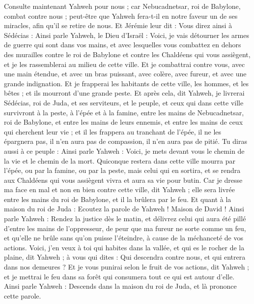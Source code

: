 \begin{multicols}{2}
Consulte maintenant Yahweh pour nous ; car Nebucadnetsar, roi de Babylone, combat contre nous ; peut-être que Yahweh fera-t-il en notre faveur un de ses miracles, afin qu'il se retire de nous.
Et Jérémie leur dit : Vous direz ainsi à Sédécias :
Ainsi parle Yahweh, le Dieu d'Israël : Voici, je vais détourner les armes de guerre qui sont dans vos mains, et avec lesquelles vous combattez en dehors des murailles contre le roi de Babylone et contre les Chaldéens qui vous assiègent, et je les rassemblerai au milieu de cette ville.
Et je combattrai contre vous, avec une main étendue, et avec un bras puissant, avec colère, avec fureur, et avec une grande indignation.
Et je frapperai les habitants de cette ville, les hommes, et les bêtes ; et ils mourront d'une grande peste.
Et après cela, dit Yahweh, je livrerai Sédécias, roi de Juda, et ses serviteurs, et le peuple, et ceux qui dans cette ville survivront à la peste, à l'épée et à la famine, entre les mains de Nebucadnetsar, roi de Babylone, et entre les mains de leurs ennemis, et entre les mains de ceux qui cherchent leur vie ; et il les frappera au tranchant de l'épée, il ne les épargnera pas, il n'en aura pas de compassion, il n'en aura pas de pitié.
Tu diras aussi à ce peuple : Ainsi parle Yahweh : Voici, je mets devant vous le chemin de la vie et le chemin de la mort.
Quiconque restera dans cette ville mourra par l'épée, ou par la famine, ou par la peste, mais celui qui en sortira, et se rendra aux Chaldéens qui vous assiègent vivra et aura sa vie pour butin.
Car je dresse ma face en mal et non en bien contre cette ville, dit Yahweh ; elle sera livrée entre les mains du roi de Babylone, et il la brûlera par le feu.
Et quant à la maison du roi de Juda : Ecoutez la parole de Yahweh !
Maison de David ! Ainsi parle Yahweh : Rendez la justice dès le matin, et délivrez celui qui aura été pillé d'entre les mains de l'oppresseur, de peur que ma fureur ne sorte comme un feu, et qu'elle ne brûle sans qu'on puisse l'éteindre, à cause de la méchanceté de vos actions.
Voici, j'en veux à toi qui habites dans la vallée, et qui es le rocher de la plaine, dit Yahweh ; à vous qui dites : Qui descendra contre nous, et qui entrera dans nos demeures ?
Et je vous punirai selon le fruit de vos actions, dit Yahweh ; et je mettrai le feu dans sa forêt qui consumera tout ce qui est autour d'elle.
\VerseOne{}Ainsi parle Yahweh : Descends dans la maison du roi de Juda, et là prononce cette parole.

\end{multicols}
